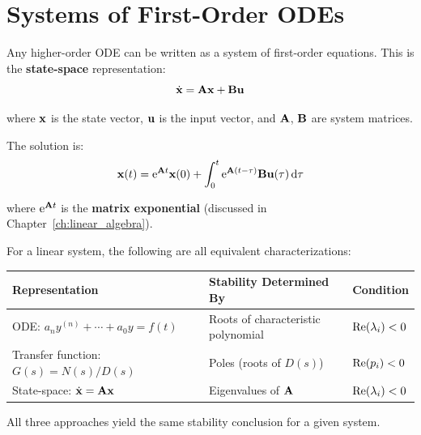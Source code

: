 \section{Systems of First-Order ODEs}

Any higher-order ODE can be written as a system of first-order equations. This is the \textbf{state-space} representation:
\begin{equation}
\dot{\mathbf{x}} = \mathbf{A}\mathbf{x} + \mathbf{B}\mathbf{u}
\end{equation}

where $\mathbf{x}$ is the state vector, $\mathbf{u}$ is the input vector, and $\mathbf{A}$, $\mathbf{B}$ are system matrices.

The solution is:
\begin{equation}
\mathbf{x}(t) = \mathrm{e}^{\mathbf{A} t}\mathbf{x}(0) + \int_0^t \mathrm{e}^{\mathbf{A}(t-\tau)}\mathbf{B}\mathbf{u}(\tau) \, \mathrm{d}\tau
\end{equation}

where $\mathrm{e}^{\mathbf{A} t}$ is the \textbf{matrix exponential} (discussed in Chapter~\ref{ch:linear_algebra}).

\begin{keyconceptbox}[title={Connection: Poles, Eigenvalues, and Stability}]
For a linear system, the following are all equivalent characterizations:
\begin{center}
\begin{tabular}{lll}
\toprule
\textbf{Representation} & \textbf{Stability Determined By} & \textbf{Condition} \\
\midrule
ODE: $a_n y^{(n)} + \cdots + a_0 y = f(t)$ & Roots of characteristic polynomial & $\operatorname{Re}(\lambda_i) < 0$ \\
Transfer function: $G(s) = N(s)/D(s)$ & Poles (roots of $D(s)$) & $\operatorname{Re}(p_i) < 0$ \\
State-space: $\dot{\mathbf{x}} = \mathbf{A}\mathbf{x}$ & Eigenvalues of $\mathbf{A}$ & $\operatorname{Re}(\lambda_i) < 0$ \\
\bottomrule
\end{tabular}
\end{center}
All three approaches yield the same stability conclusion for a given system.
\end{keyconceptbox}

